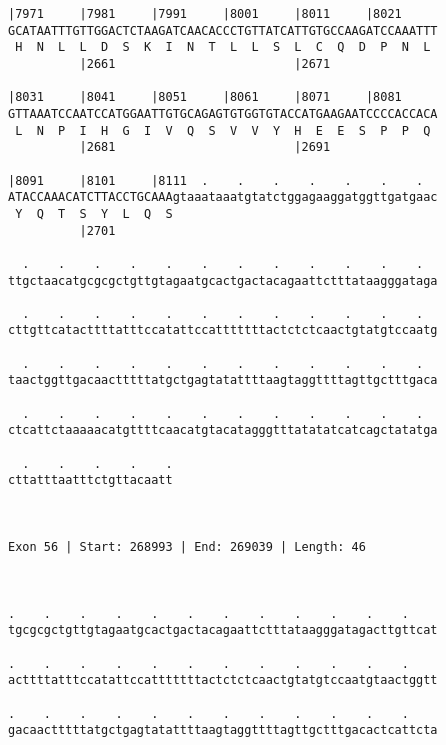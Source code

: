 \documentclass{article}
\begin{document}
\begin{Verbatim}
|7971     |7981     |7991     |8001     |8011     |8021     
GCATAATTTGTTGGACTCTAAGATCAACACCCTGTTATCATTGTGCCAAGATCCAAATTT
 H  N  L  L  D  S  K  I  N  T  L  L  S  L  C  Q  D  P  N  L 
          |2661                         |2671               
  
|8031     |8041     |8051     |8061     |8071     |8081     
GTTAAATCCAATCCATGGAATTGTGCAGAGTGTGGTGTACCATGAAGAATCCCCACCACA
 L  N  P  I  H  G  I  V  Q  S  V  V  Y  H  E  E  S  P  P  Q 
          |2681                         |2691               
  
|8091     |8101     |8111  .    .    .    .    .    .    .  
ATACCAAACATCTTACCTGCAAAgtaaataaatgtatctggagaaggatggttgatgaac
 Y  Q  T  S  Y  L  Q  S                                     
          |2701                                             
  
  .    .    .    .    .    .    .    .    .    .    .    .  
ttgctaacatgcgcgctgttgtagaatgcactgactacagaattctttataagggataga
                                                            
  .    .    .    .    .    .    .    .    .    .    .    .  
cttgttcatacttttatttccatattccatttttttactctctcaactgtatgtccaatg
                                                            
  .    .    .    .    .    .    .    .    .    .    .    .  
taactggttgacaactttttatgctgagtatattttaagtaggttttagttgctttgaca
                                                            
  .    .    .    .    .    .    .    .    .    .    .    .  
ctcattctaaaaacatgttttcaacatgtacatagggtttatatatcatcagctatatga
                                                            
  .    .    .    .    .
cttatttaatttctgttacaatt
                       
                       
 
Exon 56 | Start: 268993 | End: 269039 | Length: 46



.    .    .    .    .    .    .    .    .    .    .    .    
tgcgcgctgttgtagaatgcactgactacagaattctttataagggatagacttgttcat
                                                            
.    .    .    .    .    .    .    .    .    .    .    .    
acttttatttccatattccatttttttactctctcaactgtatgtccaatgtaactggtt
                                                            
.    .    .    .    .    .    .    .    .    .    .    .    
gacaactttttatgctgagtatattttaagtaggttttagttgctttgacactcattcta
                                                            

\end{Verbatim}
\end{document}
